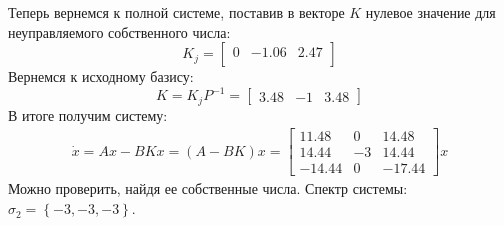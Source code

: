 Теперь вернемся к полной системе, поставив в векторе $K$ нулевое значение для неуправляемого собственного числа: 
\begin{equation}
    K_j = \begin{bmatrix}
        0  & -1.06  & 2.47 \\ 
    \end{bmatrix}
\end{equation}
Вернемся к исходному базису:
\begin{equation}
    K = K_jP^{-1} = \begin{bmatrix}
        3.48 & -1 & 3.48
    \end{bmatrix}
\end{equation}
В итоге получим систему: 
\begin{eqnarray}
    \dot{x} = Ax - BKx = (A - BK)x = \begin{bmatrix}
        11.48 & 0 & 14.48 \\
    14.44 & -3 & 14.44 \\
    -14.44 & 0 & -17.44
    \end{bmatrix} x
\end{eqnarray}
Можно проверить, найдя ее собственные числа. Спектр системы: $\sigma_2 = \left\{ -3, -3, -3 \right\}$.

